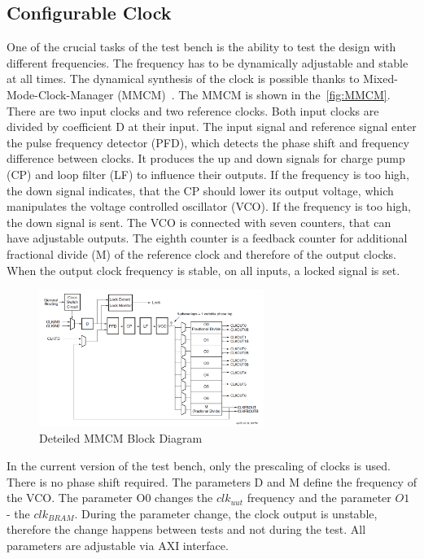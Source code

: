 \subsection{Configurable Clock}
One of the crucial tasks of the test bench is the ability to test the design with different frequencies. The frequency has to be dynamically adjustable and stable at all times. The dynamical synthesis of the clock is possible thanks to Mixed-Mode-Clock-Manager (MMCM)~\cite{manual:MMCM}. The MMCM is shown in the~\autoref{fig:MMCM}. There are two input clocks and two reference clocks. Both input clocks are divided by coefficient D at their input. The input signal and reference signal enter the pulse frequency detector (PFD), which detects the phase shift and frequency difference between clocks. It produces the up and down signals for charge pump (CP) and loop filter (LF) to influence their outputs. If the frequency is too high, the down signal indicates, that the CP should lower its output voltage, which manipulates the voltage controlled oscillator (VCO). If the frequency is too high, the down signal is sent. The VCO is connected with seven counters, that can have adjustable outputs. The eighth counter is a feedback counter for additional fractional divide (M) of the reference clock and therefore of the output clocks. When the output clock frequency is stable, on all inputs, a locked signal is set.

\begin{figure}[h]
\centering
\includegraphics[width=0.65\textwidth]{figures/MMCM.png}
\caption{Deteiled MMCM Block Diagram~\cite{manual:MMCM}}
\label{fig:MMCM}
\end{figure}

In the current version of the test bench, only the prescaling of clocks is used. There is no phase shift required. The parameters D and M define the frequency of the VCO. The parameter O0 changes the $clk_{uut}$ frequency and the parameter $O1$ - the $clk_{BRAM}$. During the parameter change, the clock output is unstable, therefore the change happens between tests and not during the test. All parameters are adjustable via AXI interface. 

